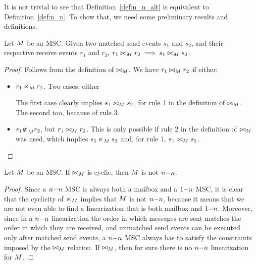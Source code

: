 It is not trivial to see that Definition~\ref{def:n_n_alt} is equivalent to Definition~\ref{def:n_n}. To show that, we need some preliminary results and definitions. 

\begin{proposition}
	Let $M$ be an MSC. Given two matched send events $s_1$ and $s_2$, and their respective receive events $r_1$ and $r_2$, $r_1 \bowtie_M r_2 \implies s_1 \bowtie_M s_2$.
\end{proposition}
\begin{proof}
Follows from the definition of $\bowtie_M$. We have $r_1 \bowtie_M r_2$ if either:
\begin{itemize}\itemsep=0.5ex
	\item $r_1 \ltimes_M r_2$. Two cases: either \begin{enumerate*}[label={(\roman*)}]
		\item $s_1 \nnrel_\msc s_2$, or 
		\item $s_1 \slashed{\nnrel}_\msc s_2$.
	\end{enumerate*}
	The first case clearly implies $s_1 \bowtie_M s_2$, for rule 1 in the definition of $\bowtie_M$. The second too, because of rule 3.
	\item  $r_1 \slashed{\ltimes}_M r_2$, but $r_1 \bowtie_M r_2$. This is only possible if rule 2 in the definition of $\bowtie_M$ was used, which implies $s_1 \nnrel_\msc s_2$ and, for rule 1, $s_1 \bowtie_M s_2$.
\end{itemize}
\end{proof}

\begin{proposition}%
	Let $M$ be an MSC. If $\bowtie_M$ is cyclic, then $M$ is not $n\mathsf{-}n$.
\end{proposition}
\begin{proof}
Since a $n\mathsf{-}n$ MSC is always both a mailbox and a $1\mathsf{-}n$ MSC, it is clear that the cyclicity of $\ltimes_M$ implies that $M$ is not $n\mathsf{-}n$, because it means that we are not even able to find a linearization that is both mailbox and $1\mathsf{-}n$. Moreover, since in a $n\mathsf{-}n$ linearization the order in which messages are sent matches the order in which they are received, and unmatched send events can be executed only after matched send events, a $n\mathsf{-}n$ MSC always has to satisfy the constraints imposed by the $\bowtie_M$ relation. If $\bowtie_M$, then for sure there is no $n\mathsf{-}n$ linearization for $M$.
\end{proof}

